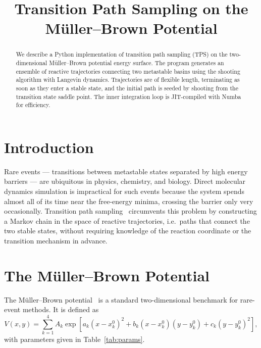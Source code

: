 \documentclass[11pt,a4paper]{article}
\title{Transition Path Sampling on the M\"{u}ller--Brown Potential}
\author{}
\date{}
\begin{document}
\maketitle

\begin{abstract}
We describe a Python implementation of transition path sampling (TPS) on the
two-dimensional M\"{u}ller--Brown potential energy surface.  The program generates
an ensemble of reactive trajectories connecting two metastable basins using the
shooting algorithm with Langevin dynamics.  Trajectories are of flexible length,
terminating as soon as they enter a stable state, and the initial path is seeded
by shooting from the transition state saddle point.  The inner integration loop
is JIT-compiled with Numba for efficiency.
\end{abstract}

\section{Introduction}

Rare events — transitions between metastable states separated by high energy
barriers — are ubiquitous in physics, chemistry, and biology.  Direct molecular
dynamics simulation is impractical for such events because the system spends
almost all of its time near the free-energy minima, crossing the barrier only
very occasionally.  Transition path sampling~\cite{Dellago1998,Bolhuis2002}
circumvents this problem by constructing a Markov chain in the space of reactive
trajectories, i.e.\ paths that connect the two stable states, without requiring
knowledge of the reaction coordinate or the transition mechanism in advance.

\section{The M\"{u}ller--Brown Potential}

The M\"{u}ller--Brown potential~\cite{Muller1979} is a standard two-dimensional
benchmark for rare-event methods.  It is defined as
\begin{equation}
    V(x,y) = \sum_{k=1}^{4} A_k \exp\!\left[
        a_k(x - x_k^0)^2
        + b_k(x - x_k^0)(y - y_k^0)
        + c_k(y - y_k^0)^2
    \right],
\end{equation}
with parameters given in Table~\ref{tab:params}.
\end{document}
